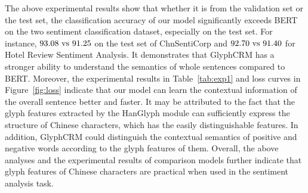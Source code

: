 The above experimental results show that whether it is from the validation set or the test set, the classification accuracy of our model significantly exceeds BERT on the two sentiment classification dataset, especially on the test set. For instance, $93.08~\rm{vs}~91.25$ on the test set of ChnSentiCorp and  $92.70~\rm{vs}~91.40$ for Hotel Review Sentiment Analysis. It demonstrates that GlyphCRM has a stronger ability to understand the semantics of whole sentences compared to BERT. Moreover, the experimental results in Table~\ref{tab:exp1} and loss curves in Figure~\ref{fig:loss} indicate that our model can learn the contextual information of the overall sentence better and faster. It may be attributed to the fact that the glyph features extracted by the HanGlyph module can sufficiently express the structure of Chinese characters, which has the easily distinguishable features.
In addition, GlyphCRM could distinguish the contextual semantics of positive and negative words according to the glyph features of them.  
Overall, the above analyses and the experimental results of comparison models further indicate that glyph features of Chinese characters are practical when used in the sentiment analysis task. 




